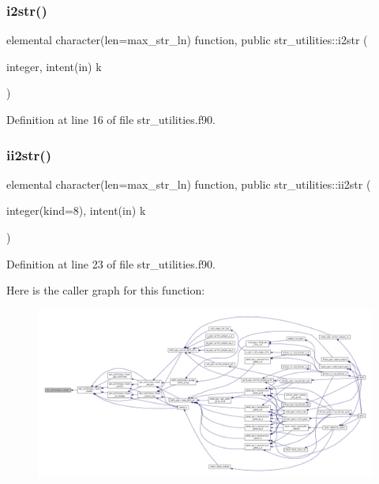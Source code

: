 \subsubsection{\texorpdfstring{i2str()}{i2str()}}
{\footnotesize\ttfamily elemental character(len=max\+\_\+str\+\_\+ln) function, public str\+\_\+utilities\+::i2str (\begin{DoxyParamCaption}\item[{integer, intent(in)}]{k }\end{DoxyParamCaption})}



Definition at line 16 of file str\+\_\+utilities.\+f90.

\mbox{\label{namespacestr__utilities_acb8c4e66aead51f178e47fdea8d7a7db}} 
\subsubsection{\texorpdfstring{ii2str()}{ii2str()}}
{\footnotesize\ttfamily elemental character(len=max\+\_\+str\+\_\+ln) function, public str\+\_\+utilities\+::ii2str (\begin{DoxyParamCaption}\item[{integer(kind=8), intent(in)}]{k }\end{DoxyParamCaption})}



Definition at line 23 of file str\+\_\+utilities.\+f90.

Here is the caller graph for this function\+:
\nopagebreak
\begin{figure}[H]
\begin{center}
\leavevmode
\includegraphics[width=350pt]{namespacestr__utilities_acb8c4e66aead51f178e47fdea8d7a7db_icgraph}
\end{center}
\end{figure}
\mbox{\label{namespacestr__utilities_a6ab16f33c155db79844279c6a56a494c}} 
